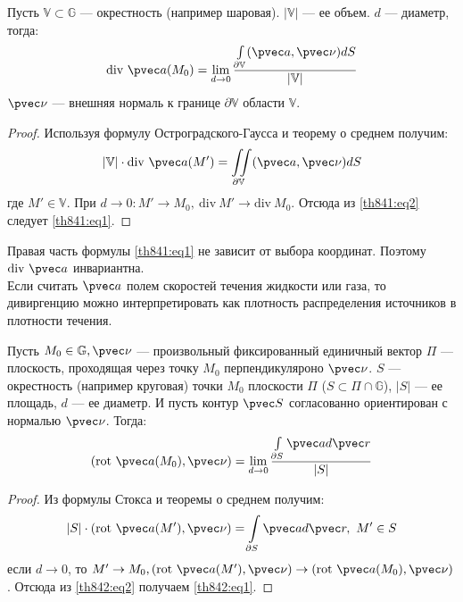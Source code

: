 \begin{theorem}
  Пусть $\mathbb{V} \subset \mathbb{G}$ --- окрестность (например шаровая).
  $|\mathbb{V}|$ --- ее объем. $d$ --- диаметр, тогда:
  \begin{gather}
    \mbox{div} \ \pvec a(M_0) = \lim\limits_{d \to 0}
    \frac{\int\limits_{\partial \mathbb{V}} (\pvec a, \pvec \nu)
    dS}{|\mathbb{V}|}
    \label{th841:eq1}
  \end{gather}
  $\pvec \nu$ --- внешняя нормаль к границе $\partial \mathbb{V}$ области
  $\mathbb{V}$.
\end{theorem}

\begin{proof}
  Используя формулу Остроградского-Гаусса и теорему о среднем получим:
  \begin{gather}
    |\mathbb{V}| \cdot \mbox{div} \ \pvec a(M') = \iint\limits_{\partial
      \mathbb{V}}
    (\pvec a, \pvec \nu) dS
    \label{th841:eq2}
  \end{gather}
  где $M' \in \mathbb{V}$. При $d \to 0: M' \to M_0, \ \mbox{div} \ M' \to
  \mbox{div} \ M_0$. Отсюда из \eqref{th841:eq2} следует \eqref{th841:eq1}.
\end{proof}
Правая часть формулы \eqref{th841:eq1} не зависит от выбора координат. Поэтому
$\mbox{div} \ \pvec a$ инвариантна. \\

Если считать $\pvec a$ полем скоростей течения жидкости или газа, то
дивиргенцию можно интерпретировать как плотность распределения источников в
плотности течения.

\begin{theorem}
  Пусть $M_0 \in \mathbb{G}, \pvec \nu$ --- произвольный фиксированный
  единичный вектор $\Pi$ --- плоскость, проходящая через точку $M_0$
  перпендикуляроно $\pvec \nu$. $S$ --- окрестность (например круговая) точки
  $M_0$ плоскости $\Pi$ ($S \subset \Pi \cap \mathbb{G}$), $|S|$ --- ее
  площадь, $d$ --- ее диаметр. И пусть контур $\pvec S$ согласованно ориентирован с
  нормалью $\pvec \nu$. Тогда:
  \begin{gather}
    (\mbox{rot} \ \pvec a(M_0), \pvec \nu) = \lim\limits_{d \to 0}
    \frac{\int\limits_{\partial S} \pvec a d \pvec r}{|S|}
    \label{th842:eq1}
  \end{gather}
\end{theorem}

\begin{proof}
  Из формулы Стокса и теоремы о среднем получим:
  \begin{gather}
    |S| \cdot (\mbox{rot} \ \pvec a(M'), \pvec \nu) = \int\limits_{\partial S}
    \pvec a d \pvec r, \ M' \in S
    \label{th842:eq2}
  \end{gather}
  если $d \to 0$, то $M' \to M_0, (\mbox{rot} \ \pvec a(M'), \pvec \nu) \to
  (\mbox{rot} \ \pvec a(M_0), \pvec \nu)$. Отсюда из \eqref{th842:eq2} получаем
  \eqref{th842:eq1}.
\end{proof}

